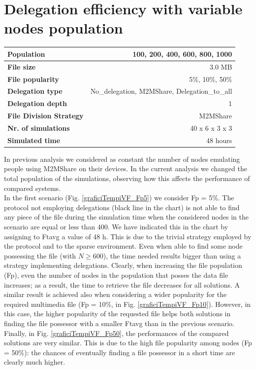 \section{Delegation efficiency with variable nodes population}
\begin{table}[h]
\begin{center}
\begin{tabular}{|l|r|}
\hline
\bfseries Population & 100, 200, 400, 600, 800, 1000 \\
\hline
\bfseries File size & 3.0 MB \\
\hline
\bfseries File popularity & 5\%, 10\%, 50\% \\
\hline
\bfseries Delegation type & No\_delegation, M2MShare, Delegation\_to\_all \\
\hline
\bfseries Delegation depth & 1 \\
\hline
\bfseries File Division Strategy & M2MShare \\
\hline
\bfseries Nr. of simulations & 40 x 6 x 3 x 3\\
\hline
\bfseries Simulated time & 48 hours \\
\hline
\end{tabular}
\end{center}
\end{table}
In previous analysis we considered as constant the number of nodes emulating people using M2MShare on their devices. In the current analysis we changed the total population of the simulations, observing how this affects the performance of compared systems.\\

In the first scenario (Fig. \ref{graficiTempiVF_Fp5}) we consider Fp = 5\%. The protocol not employing delegations (black line in the chart) is not able to find any piece of the file during the simulation time when the considered nodes in the scenario are equal or less than 400. We have indicated this in the chart by assigning to Ftavg a value of 48 h. This is due to the trivial strategy employed by the protocol and to the sparse environment. Even when able to find some node possessing the file (with $N \geq 600$), the time needed results bigger than using a strategy implementing delegations. Clearly, when increasing the file population (Fp), even the number of nodes in the population that posses the data file increases; as a result, the time to retrieve the file decreases for all solutions. A similar result is achieved also when considering a wider popularity for the required multimedia file (Fp = 10\%, in Fig. \ref{graficiTempiVF_Fp10}). However, in this case, the higher popularity of the requested file helps both solutions in finding the file possessor with a smaller Ftavg than in the previous scenario.  Finally, in Fig. \ref{graficiTempiVF_Fp50}, the performances of the compared solutions are very similar. This is due to the high file popularity among nodes (Fp = 50\%): the chances of eventually finding a file possessor in a short time are clearly much higher.

